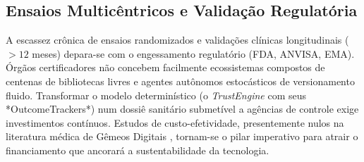 \subsection{Ensaios Multicêntricos e Validação Regulatória}
A escassez crônica de ensaios randomizados e validações clínicas longitudinais ($>12$ meses) depara-se com o engessamento regulatório (FDA, ANVISA, EMA). Órgãos certificadores não concebem facilmente ecossistemas compostos de centenas de bibliotecas livres e agentes autônomos estocásticos de versionamento fluido. Transformar o modelo determinístico (o \textit{TrustEngine} com seus *OutcomeTrackers*) num dossiê sanitário submetível a agências de controle exige investimentos contínuos. Estudos de custo-efetividade, presentemente nulos na literatura médica de Gêmeos Digitais \cite{katsoulakis2024digital}, tornam-se o pilar imperativo para atrair o financiamento que ancorará a sustentabilidade da tecnologia.
